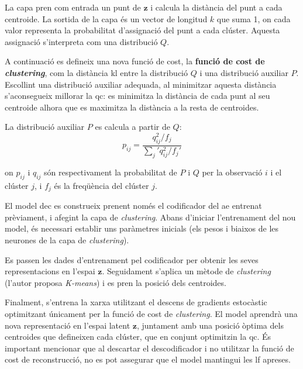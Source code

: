 \documentclass[CAT,BIB]{TFUOC}%
\begin{document}
        La capa pren com entrada un punt de $\mathbf{z}$
        i calcula la distància del punt a cada centroide.
        La sortida de la capa és un vector de longitud $k$ que suma 1,
        on cada valor representa la probabilitat d'assignació del punt a cada clúster.
        Aquesta assignació s'interpreta com una distribució $Q$.

        A continuació es defineix una nova funció de cost,
        la \textbf{funció de cost de \textit{clustering}},
        com la distància \gls{kl} entre la distribució $Q$
        i una distribució auxiliar $P$.
        Escollint una distribució auxiliar adequada,
        al minimitzar aquesta distància
        s'aconsegueix millorar la \gls{qc}:
        es minimitza la distància de cada punt al seu centroide
        alhora que es maximitza la distància a la resta de centroides.

        La distribució auxiliar $P$ es calcula
        a partir de $Q$:
        \begin{equation}
            \label{eq:clustering_aux}
            p_{ij} =
            \frac {q_{ij}^2 / f_j}
            {\sum_j' q_{ij}^2 / f_j'}
        \end{equation}

        on $p_{ij}$ i $q_{ij}$ són respectivament la probabilitat
        de $P$ i $Q$ per la observació $i$ i el clúster $j$,
        i $f_j$ és la freqüència del clúster $j$.

        El model \gls{dec} es construeix prenent només el codificador
        del \gls{ae} entrenat prèviament,
        i afegint la capa de \textit{clustering}.
        Abans d'iniciar l'entrenament del nou model,
        és necessari establir uns paràmetres inicials
        (els pesos i biaixos de les neurones de la capa de \textit{clustering}).

        Es passen les dades d'entrenament pel codificador
        per obtenir les seves representacions en l'espai $\mathbf{z}$.
        Seguidament s'aplica un mètode de \textit{clustering}
        (l'autor proposa \textit{K-means})
        i es pren la posició dels centroides.

        Finalment, s'entrena la xarxa utilitzant el descens de gradients estocàstic
        optimitzant únicament per la funció de cost de \textit{clustering}.
        El model aprendrà una nova representació en l'espai latent $\mathbf{z}$,
        juntament amb una posició òptima dels centroides que defineixen cada clúster,
        que en conjunt optimitzin la \gls{qc}.
        És important mencionar que al descartar el descodificador
        i no utilitzar la funció de cost de reconstrucció,
        no es pot assegurar que el model mantingui les \gls{lf} apreses.
\end{document}

